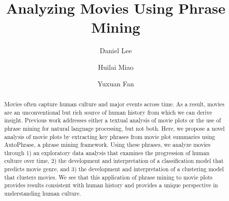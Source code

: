 \documentclass[hidelinks]{article}
\title{Analyzing Movies Using Phrase Mining}
\author{Daniel Lee \and Huilai Miao \and Yuxuan Fan}
\begin{document}
\maketitle

\begin{abstract} %
Movies often capture human culture and major events across time. As a result, movies are an unconventional but rich source of human history from which we can derive insight. Previous work addresses either a textual analysis of movie plots or the use of phrase mining for natural language processing, but not both. Here, we propose a novel analysis of movie plots by extracting key phrases from movie plot summaries using AutoPhrase, a phrase mining framework. Using these phrases, we analyze movies through 1) an exploratory data analysis that examines the progression of human culture over time, 2) the development and interpretation of a classification model that predicts movie genre, and 3) the development and interpretation of a clustering model that clusters movies. We see that this application of phrase mining to movie plots provides results consistent with human history and provides a unique perspective in understanding human culture.
\end{abstract}
\end{document}
